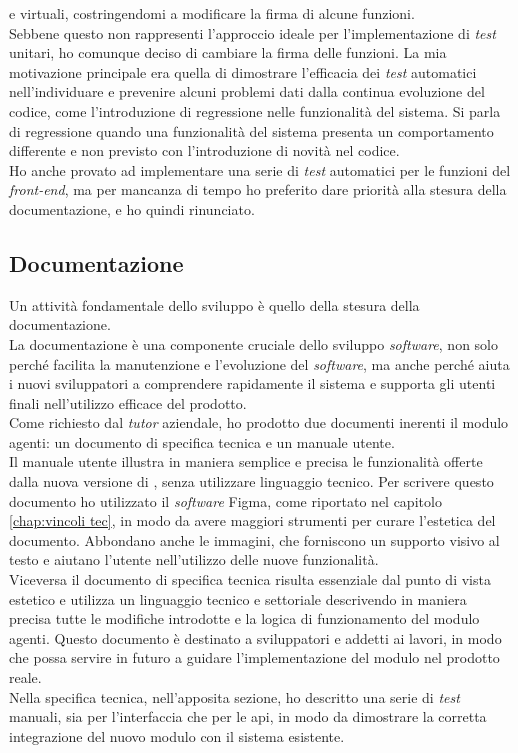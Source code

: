 e virtuali, costringendomi a modificare la firma di alcune funzioni.\\
Sebbene questo non rappresenti l'approccio ideale per l'implementazione di \textit{test} unitari, ho comunque deciso di 
cambiare la firma delle funzioni. La mia motivazione principale era quella di dimostrare l'efficacia dei \textit{test} 
automatici nell'individuare e prevenire alcuni problemi dati dalla continua evoluzione del codice, come 
l'introduzione di regressione nelle funzionalità del sistema. Si parla di regressione quando una funzionalità del 
sistema presenta un comportamento differente e non previsto con l'introduzione di novità nel codice.\\
Ho anche provato ad implementare una serie di \textit{test} automatici per le funzioni del \textit{front-end}, ma per mancanza 
di tempo ho preferito dare priorità alla stesura della documentazione, e ho quindi rinunciato.\\

\subsection{Documentazione}
Un attività fondamentale dello sviluppo è quello della stesura della documentazione.\\
La documentazione è una componente cruciale dello sviluppo \textit{software}, non solo perché facilita la manutenzione 
e l'evoluzione del \textit{software}, ma anche perché aiuta i nuovi sviluppatori a comprendere rapidamente il sistema 
e supporta gli utenti finali nell'utilizzo efficace del prodotto.\\
Come richiesto dal \textit{tutor} aziendale, ho prodotto due documenti inerenti il modulo agenti: un documento di 
specifica tecnica e un manuale utente.\\
Il manuale utente illustra in maniera semplice e precisa le funzionalità offerte dalla nuova versione di {\movi}, 
senza utilizzare linguaggio tecnico. Per scrivere questo documento ho utilizzato il \textit{software} Figma, come 
riportato nel capitolo \ref{chap:vincoli tec}, in modo da avere maggiori strumenti per curare l'estetica del documento. 
Abbondano anche le immagini, che forniscono un supporto visivo al testo e aiutano l'utente nell'utilizzo delle nuove 
funzionalità.\\
Viceversa il documento di specifica tecnica risulta essenziale dal punto di vista estetico e utilizza un linguaggio 
tecnico e settoriale descrivendo in maniera precisa tutte le modifiche introdotte e la logica di funzionamento 
del modulo agenti. Questo documento è destinato a sviluppatori e addetti ai lavori, in modo che possa servire in 
futuro a guidare l'implementazione del modulo nel prodotto reale.\\
Nella specifica tecnica, nell'apposita sezione, ho descritto una serie di \textit{test} manuali, sia per l'interfaccia 
che per le \gls{api}, in modo da dimostrare la corretta integrazione del nuovo modulo con il sistema esistente.